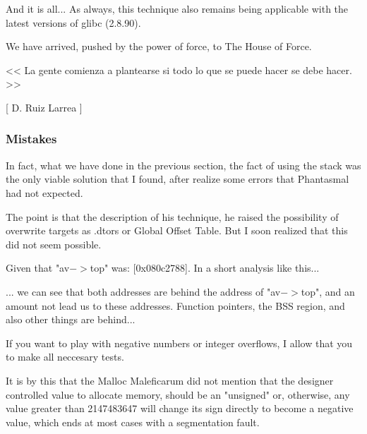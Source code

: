 \documentclass[12pt]{article}
\begin{document}
And it is all... As always, this technique also remains being applicable
with the latest versions of glibc (2.8.90).
\newline


We have arrived, pushed by the power of force, to The House of Force.


\begin{verbnobox}[\small]
                          << La gente comienza a plantearse
                             si todo lo que se puede hacer
                             se debe hacer. >>

                                          [ D. Ruiz Larrea ]
\end{verbnobox}

\subsubsection{Mistakes}

In fact, what we have done in the previous section, the fact of using the
stack was the only viable solution that I found, after realize some errors
that Phantasmal had not expected.
\newline


The point is that the description of his technique, he raised the
possibility of overwrite targets as .dtors or Global Offset Table.
But I soon realized that this did not seem possible.
\newline


Given that "av$->$top" was: [0x080c2788]. In a short analysis like this...

... we can see that both addresses are behind the address of "av$->$top",
and an amount not lead us to these addresses. Function pointers, the BSS
region, and also other things are behind...
\newline


If you want to play with negative numbers or integer overflows, I allow
that you to make all neccesary tests.
\newline


It is by this that the Malloc Maleficarum did not mention that the
designer controlled value to allocate memory, should be an "unsigned" or,
otherwise, any value greater than 2147483647 will change its sign directly
to become a negative value, which ends at most cases with a segmentation
fault.
\newline
\end{document}
